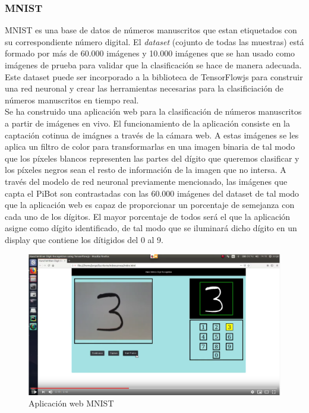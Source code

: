 \documentclass{report}
\begin{document}
\subsubsection{MNIST}
MNIST es una base de datos de números manuscritos que estan etiquetados con su correspondiente número digital. El \textit{dataset} (cojunto de todas las muestras) está formado por más de 60.000 imágenes y 10.000 imágenes que se han usado como imágenes de prueba para validar que la clasificación se hace de manera adecuada. Este dataset puede ser incorporado a la biblioteca de TensorFlowjs para construir una red neuronal y crear las herramientas necesarias para la clasificiación de números manuscritos en tiempo real.
\\

Se ha construido una aplicación web para la clasificación de números manuscritos a partir de imágenes en vivo. El funcionamiento de la aplicación consiste en la captación cotinua de imágnes a través de la cámara web. A estas imágenes se les aplica un filtro de color para transformarlas en una imagen binaria de tal modo que los píxeles blancos representen las partes  del dígito que queremos clasificar y los píxeles negros sean el resto de información de la imagen que no intersa. A través del modelo de red neuronal previamente mencionado, las imágenes que capta el PiBot son contrastadas con las 60.000 imágenes del dataset de tal modo que la aplicación web es capaz de proporcionar un porcentaje de semejanza con cada uno de los dígitos. El mayor porcentaje de todos será el que la aplicación asigne como dígito identificado, de tal modo que se iluminará dicho dígito en un display que contiene los dítigidos del 0 al 9.

\renewcommand{\figurename}{Figura}		
\begin{figure}[h]
	\centering
	 \includegraphics[scale=0.18]{images/cap4/mnist.png}
	 \caption{Aplicación web MNIST}
\end{figure}
\end{document}
